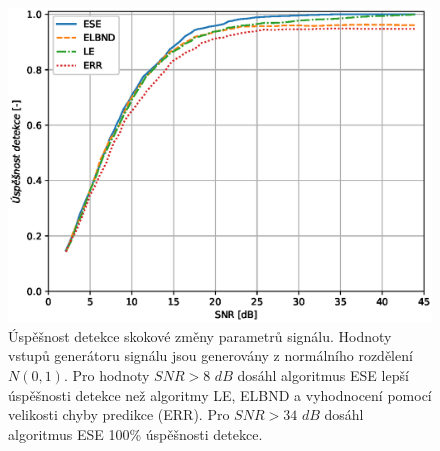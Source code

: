 \begin{figure}[!h]
    \centering
    \includegraphics[scale=0.66]{IMG/mdpi/stepnorm_stats.eps}
    \caption{Úspěšnost detekce skokové změny parametrů signálu. Hodnoty vstupů generátoru signálu jsou generovány z normálního rozdělení $N(0,1)$. Pro hodnoty $SNR > 8$ $dB$ dosáhl algoritmus ESE  lepší úspěšnosti detekce než algoritmy LE, ELBND a vyhodnocení pomocí velikosti chyby predikce (ERR). Pro $SNR > 34$ $dB$ dosáhl algoritmus ESE 100\% úspěšnosti detekce.}
    \label{fig:step_norm_stats}
\end{figure}


